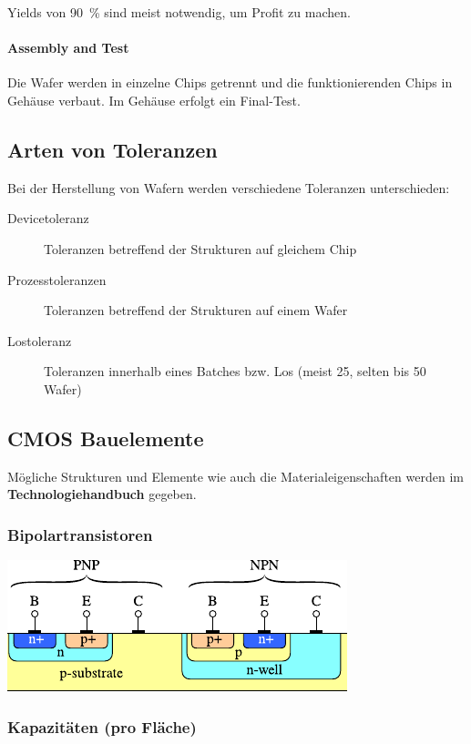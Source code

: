 Yields von \qty{90}{\percent} sind meist notwendig, um Profit zu machen.

\paragraph{Assembly and Test}
Die Wafer werden in einzelne Chips getrennt und die funktionierenden Chips in Gehäuse verbaut. Im Gehäuse erfolgt ein Final-Test.


\subsection{Arten von Toleranzen}
Bei der Herstellung von Wafern werden verschiedene Toleranzen unterschieden:
\begin{description}
    \item[Devicetoleranz] Toleranzen betreffend der Strukturen auf gleichem Chip
    \item[Prozesstoleranzen] Toleranzen betreffend der Strukturen auf einem Wafer
    \item[Lostoleranz] Toleranzen innerhalb eines Batches bzw. Los (meist 25, selten bis 50 Wafer)
\end{description}

\subsection{CMOS Bauelemente}
Mögliche Strukturen und Elemente wie auch die Materialeigenschaften werden im \textbf{Technologiehandbuch} gegeben.


\subsubsection{Bipolartransistoren}
\begin{center}
    \includegraphics[width=0.5\columnwidth, align=t]{images/01_BJT.pdf}
\end{center}


\subsubsection{Kapazitäten (pro Fläche)}

\vspace{-0.3cm}

